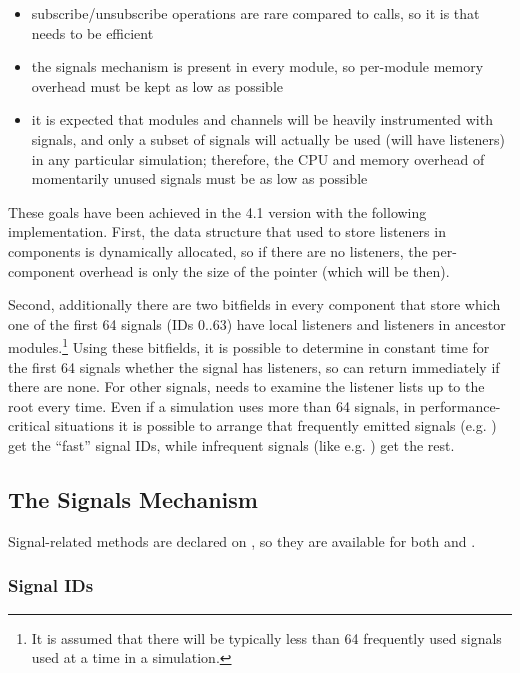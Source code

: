 \begin{itemize}
  \item subscribe/unsubscribe operations are rare compared to 
    calls, so it is  that needs to be efficient
  \item the signals mechanism is present in every module, so per-module
    memory overhead must be kept as low as possible
  \item it is expected that modules and channels will be heavily instrumented
    with signals, and only a subset of signals will actually be used
    (will have listeners) in any particular simulation; therefore,
    the CPU and memory overhead of momentarily unused signals must be
    as low as possible
\end{itemize}

These goals have been achieved in the 4.1 version with the following
implementation. First, the data structure that used to store listeners in
components is dynamically allocated, so if there are no listeners, the
per-component overhead is only the size of the pointer (which will be
 then).

Second, additionally there are two bitfields in every component that store
which one of the first 64 signals (IDs 0..63) have local listeners and
listeners in ancestor modules.\footnote{It is assumed that there will be
typically less than 64 frequently used signals used at a time in a
simulation.} Using these bitfields, it is possible to determine in constant
time for the first 64 signals whether the signal has listeners, so
 can return immediately if there are none. For other signals,
 needs to examine the listener lists up to the root every
time. Even if a simulation uses more than 64 signals, in
performance-critical situations it is possible to arrange that frequently
emitted signals (e.g. ) get the ``fast'' signal IDs, while
infrequent signals (like e.g. ) get the rest.


\subsection{The Signals Mechanism}
\label{sec:simple-modules:signals-api}

Signal-related methods are declared on , so they are available
for both  and .

\subsubsection{Signal IDs}
\label{sec:simple-modules:signal-ids}


